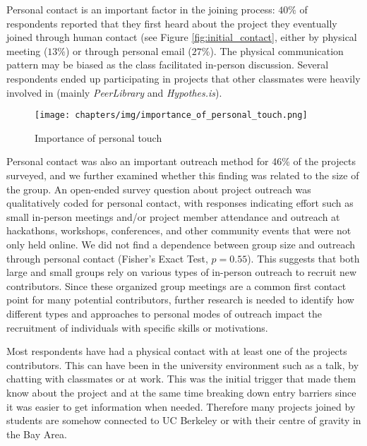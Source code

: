 Personal contact is an important factor in the joining process: $40\%$ of respondents reported that they first heard about the project they eventually joined through human contact (see Figure \ref{fig:initial_contact}, either by physical meeting ($13\%$) or through personal email ($27\%$). The physical communication pattern may be biased as the class facilitated in-person discussion. Several respondents ended up participating in projects that other classmates were heavily involved in (mainly {\it PeerLibrary} and {\it Hypothes.is}). 

\begin{figure}[ht!]
\centering
\texttt{[image: chapters/img/importance\_of\_personal\_touch.png]}
\caption{Importance of personal touch}
\label{fig:personal_touch}
\end{figure}

Personal contact was also an important outreach method for 46\% of the projects surveyed, and we further examined whether this finding was related to the size of the group. An open-ended survey question about project outreach was qualitatively coded for personal contact, with responses indicating effort such as small in-person meetings and/or project member attendance and outreach at hackathons, workshops, conferences, and other community events that were not only held online. We did not find a dependence between group size and outreach through personal contact (Fisher's Exact Test, $p = 0.55$). This suggests that both large and small groups rely on various types of in-person outreach to recruit new contributors. Since these organized group meetings are a common first contact point for many potential contributors, further research is needed to identify how different types and approaches to personal modes of outreach impact the recruitment of individuals with specific skills or motivations.

Most respondents have had a physical contact with at least one of the projects contributors. This can have been in the university environment such as a talk, by chatting with classmates or at work. This was the initial trigger that made them know about the project and at the same time breaking down entry barriers since it was easier to get information when needed. Therefore many projects joined by students are somehow connected to UC Berkeley or with their centre of gravity in the Bay Area.